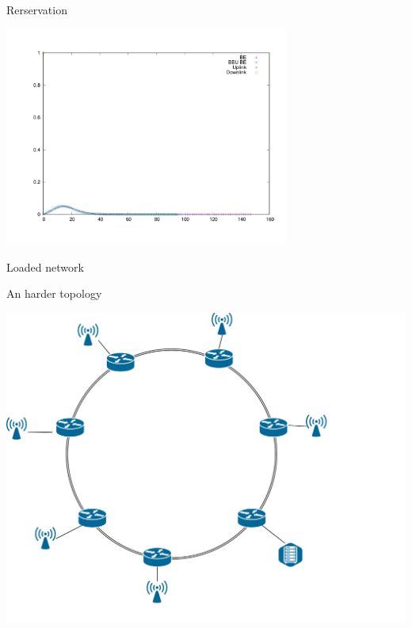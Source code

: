 \documentclass[10 pt]{beamer}
\begin{document}
\begin{frame}{Rerservation}



\centering \includegraphics[width=0.7\textwidth]{Resa_high_1.pdf} 


\centering Loaded network

\end{frame}


\begin{frame}{An harder topology}


\hspace{2cm}
\includegraphics[scale=0.35]{anneau_probleme.pdf}


\end{frame}
\end{document}
